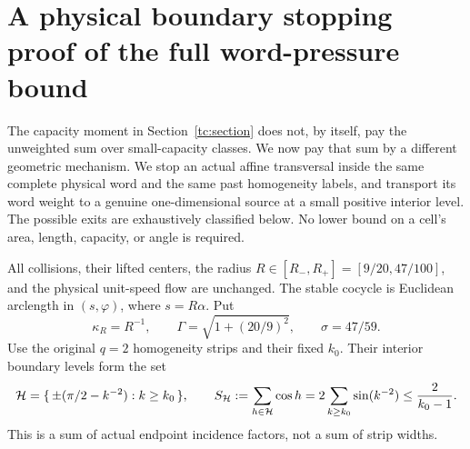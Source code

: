 \section{A physical boundary stopping proof of the full word-pressure bound}
\label{ps:section}

The capacity moment in Section~\ref{tc:section} does not, by itself,
pay the unweighted sum over small-capacity classes.  We now pay that
sum by a different geometric mechanism.  We stop an actual affine
transversal inside the same complete physical word and the same
past homogeneity labels, and transport its word weight to a genuine
one-dimensional source at a small positive interior level.  The
possible exits are exhaustively classified below.  No lower bound
on a cell's area, length, capacity, or angle is required.

All collisions, their lifted centers, the radius
$R\in[R_-,R_+]=[9/20,47/100]$, and the physical unit-speed flow are
unchanged.  The stable cocycle is Euclidean arclength in $(s,\varphi)$,
where $s=R\alpha$.  Put
\[
 \kappa_R=R^{-1},\qquad
 \Gamma=\sqrt{1+(20/9)^2},\qquad
 \sigma=47/59.
\]
Use the original $q=2$ homogeneity strips and their fixed $k_0$.
Their interior boundary levels form the set
\[
 \mathcal H=\{\,\pm(\pi/2-k^{-2}):k\ge k_0\,\},\qquad
 S_{\mathcal H}:=\sum_{h\in\mathcal H}\cos h
     =2\sum_{k\ge k_0}\sin(k^{-2})
     \le {2\over k_0-1}.
\]
This is a sum of actual endpoint incidence factors, not a sum of
strip widths.

